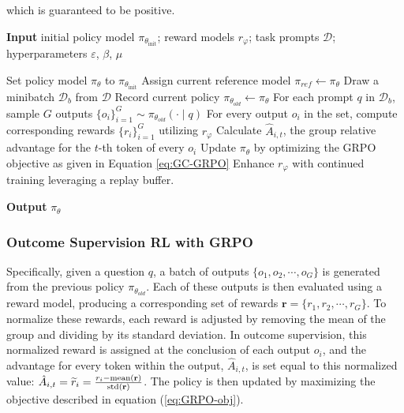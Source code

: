 \begin{itemize}[topsep=0pt]
\begin{itemize}[topsep=0pt]
which is guaranteed to be positive.

\begin{algorithm}[t]
  \small
  \caption{Iterative Group Relative Policy Optimization}
  \textbf{Input} initial policy model $\pi_{\theta_{\text{init}}}$; reward models $r_\varphi$; task prompts $\mathcal{D}$; 
  hyperparameters $\varepsilon$, $\beta$, $\mu$
  \begin{algorithmic}[1]
    \State Set policy model $\pi_\theta$ to $\pi_{\theta_{\text{init}}}$
      \State Assign current reference model $\pi_{ref} \gets \pi_{\theta}$
        \State Draw a minibatch $\mathcal{D}_b$ from $\mathcal{D}$
        \State Record current policy $\pi_{\theta_{old}} \gets \pi_{\theta}$
        \State For each prompt $q$ in $\mathcal{D}_b$, sample $G$ outputs $\{o_i\}_{i=1}^G \sim \pi_{\theta_{old}} (\cdot \mid q) $
        \State For every output $o_i$ in the set, compute corresponding rewards $\{r_i\}_{i=1}^{G}$ utilizing $r_{\varphi}$
        \State Calculate $\hat{A}_{i,t}$, the group relative advantage for the $t$-th token of every $o_i$
          \State Update $\pi_{\theta}$ by optimizing the GRPO objective as given in Equation \ref{eq:GC-GRPO}
        \EndFor
      \EndFor 
      \State Enhance $r_\varphi$ with continued training leveraging a replay buffer. 
    \EndFor 
  \end{algorithmic}
  \textbf{Output} $\pi_\theta$
  \label{alg:iter-grpo}
\end{algorithm}

\subsubsection{Outcome Supervision RL with GRPO} Specifically, given a question $q$, a batch of outputs $\{o_1, o_2, \cdots, o_G\}$ is generated from the previous policy $\pi_{\theta_{old}}$. Each of these outputs is then evaluated using a reward model, producing a corresponding set of rewards $\mathbf{r}=\{r_1, r_2, \cdots, r_G\}$. To normalize these rewards, each reward is adjusted by removing the mean of the group and dividing by its standard deviation. In outcome supervision, this normalized reward is assigned at the conclusion of each output $o_i$, and the advantage for every token within the output, $\hat{A}_{i, t}$, is set equal to this normalized value: $\hat{A}_{i, t} = \widetilde{r}_i = \frac{r_i- {\rm mean}(\mathbf{r})}{{\rm std}(\mathbf{r})}$. The policy is then updated by maximizing the objective described in equation (\ref{eq:GRPO-obj}).


\end{itemize}
\end{itemize}
